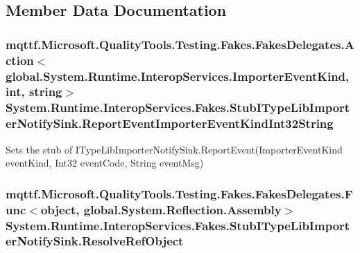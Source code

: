 \subsection{Member Data Documentation}
\hypertarget{class_system_1_1_runtime_1_1_interop_services_1_1_fakes_1_1_stub_i_type_lib_importer_notify_sink_ae2d828e35de61e2392c3e20b85ddc328}{
\subsubsection[{Report\-Event\-Importer\-Event\-Kind\-Int32\-String}]{\setlength{\rightskip}{0pt plus 5cm}mqttf.\-Microsoft.\-Quality\-Tools.\-Testing.\-Fakes.\-Fakes\-Delegates.\-Action$<$global.\-System.\-Runtime.\-Interop\-Services.\-Importer\-Event\-Kind, int, string$>$ System.\-Runtime.\-Interop\-Services.\-Fakes.\-Stub\-I\-Type\-Lib\-Importer\-Notify\-Sink.\-Report\-Event\-Importer\-Event\-Kind\-Int32\-String}}\label{class_system_1_1_runtime_1_1_interop_services_1_1_fakes_1_1_stub_i_type_lib_importer_notify_sink_ae2d828e35de61e2392c3e20b85ddc328}


Sets the stub of I\-Type\-Lib\-Importer\-Notify\-Sink.\-Report\-Event(\-Importer\-Event\-Kind event\-Kind, Int32 event\-Code, String event\-Msg)

\hypertarget{class_system_1_1_runtime_1_1_interop_services_1_1_fakes_1_1_stub_i_type_lib_importer_notify_sink_a0568812bf87c5fe7acf54ab952dd07df}{
\subsubsection[{Resolve\-Ref\-Object}]{\setlength{\rightskip}{0pt plus 5cm}mqttf.\-Microsoft.\-Quality\-Tools.\-Testing.\-Fakes.\-Fakes\-Delegates.\-Func$<$object, global.\-System.\-Reflection.\-Assembly$>$ System.\-Runtime.\-Interop\-Services.\-Fakes.\-Stub\-I\-Type\-Lib\-Importer\-Notify\-Sink.\-Resolve\-Ref\-Object}}\label{class_system_1_1_runtime_1_1_interop_services_1_1_fakes_1_1_stub_i_type_lib_importer_notify_sink_a0568812bf87c5fe7acf54ab952dd07df}


